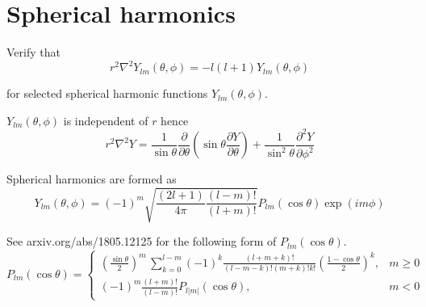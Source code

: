 

\section*{Spherical harmonics}

Verify that
\begin{equation*}
r^2\nabla^2Y_{lm}(\theta,\phi)=-l(l+1)Y_{lm}(\theta,\phi)
\tag{1}
\end{equation*}

for selected spherical harmonic functions $Y_{lm}(\theta,\phi)$.

\bigskip
$Y_{lm}(\theta,\phi)$ is independent of $r$ hence
\begin{equation*}
r^2\nabla^2Y=\frac{1}{\sin\theta}\frac{\partial}{\partial\theta}
\left(\sin\theta\frac{\partial Y}{\partial\theta}\right)
+\frac{1}{\sin^2\theta}\frac{\partial^2Y}{\partial\phi^2}
\end{equation*}

Spherical harmonics are formed as
\begin{equation*}
Y_{lm}(\theta,\phi)=(-1)^m\sqrt{\frac{(2l+1)}{4\pi}\frac{(l-m)!}{(l+m)!}}
P_{lm}(\cos\theta)\exp(im\phi)
\end{equation*}

See arxiv.org/abs/1805.12125 for the following form of $P_{lm}(\cos\theta)$.
\begin{equation*}
P_{lm}(\cos\theta)=\begin{cases}\displaystyle
\left(\frac{\sin\theta}{2}\right)^m\,\sum_{k=0}^{l-m}
(-1)^k\frac{(l+m+k)!}{(l-m-k)!(m+k)!k!}
\left(\frac{1-\cos\theta}{2}\right)^k, & m\ge0
\\[4ex]
\displaystyle(-1)^m\frac{(l+m)!}{(l-m)!}P_{l|m|}(\cos\theta), & m<0
\end{cases}
\end{equation*}


